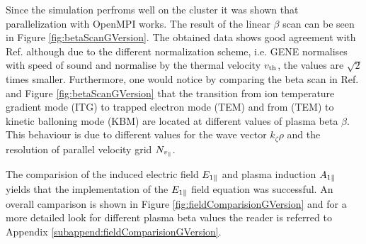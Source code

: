 Since the simulation perfroms well on the cluster it was shown that parallelization with OpenMPI works. The result of the linear $\beta$ scan can be seen in Figure \ref{fig:betaScanGVersion}. The obtained data shows good agreement with Ref.  although due to the different normalization scheme, i.e. GENE normalises with speed of sound and {\gkw} normalise by the thermal velocity $v_\mathrm{th}$, the values are $\sqrt{2}$ times smaller. Furthermore, one would notice by comparing the beta scan in Ref.  and Figure \ref{fig:betaScanGVersion} that the transition from ion temperature gradient mode (ITG) to trapped electron mode (TEM) and from (TEM) to kinetic balloning mode (KBM) are located at different values of plasma beta $\beta$. This behaviour is due to different values for the wave vector $k_\zeta \rho$ and the resolution of parallel velocity grid $N_{v_\parallel}$. %


The comparision of the induced electric field $E_{1\parallel}$ and plasma induction $A_{1\parallel}$ yields that the implementation of the $E_{1\parallel}$ field equation was successful. An overall camparison is shown in Figure \ref{fig:fieldComparisionGVersion} and for a more detailed look for different plasma beta values the reader is referred to Appendix \ref{subappend:fieldComparisionGVersion}.



\newpage